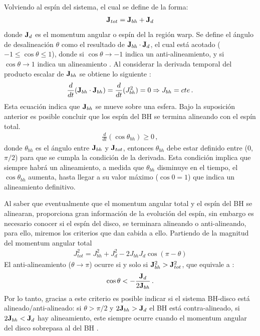 Volviendo al espín del sistema, el cual se define de la forma:
\begin{align}
	{\bf{J}}_{tot}= {\bf{J}}_{bh}+{\bf{J}}_{d}
\end{align}
donde ${\bf{J}}_{d}$ es el momentum angular o espín del la región warp. Se define el ángulo de desalineación $\theta$ como el resultado de  ${\bf{J}}_{bh}\cdot{\bf{J}}_{d}$, el cual está acotado ($-1\leq \cos\theta \leq 1$), donde si $\cos \theta \to -1$ indica un anti-alineamiento, y si $\cos \theta \to 1$ indica un alineamiento \cite{king2005}. Al considerar la derivada temporal del producto escalar de  ${\bf{J}}_{bh}$ se obtiene lo siguiente \cite{king2005}:
%
\begin{align}
    \frac{d }{dt}({\bf{J}}_{bh}\cdot {\bf{J}}_{bh})=  \frac{d}{dt}(J_{bh}^{2})= 0 \Rightarrow J_{bh}=cte\,.
\end{align}
%
Esta ecuación indica que ${\bf{J}}_{bh}$ se mueve sobre una esfera. Bajo la suposición anterior es posible concluir que los espín del BH se termina alineando con el espín total. 
%
\begin{align}
    \frac{d}{dt}(\cos\theta_{bh})\geq 0\,,
\end{align}
%
donde $\theta_{bh}$ es el ángulo entre ${\bf{J}}_{bh}$ y ${\bf{J}}_{tot}$, entonces $\theta_{bh}$ debe estar definido entre (0,$\pi/2$) para que se cumpla la condición de la derivada. Esta condición implica que siempre habrá un alineamiento, a medida que $\theta_{bh}$ disminuye en el tiempo, el $\cos\theta_{bh}$ aumenta, hasta llegar a su valor máximo ($\cos 0=1$) que indica un alineamiento definitivo.%

Al saber que eventualmente que el momentum angular total y el espín del BH se alinearan, proporciona gran información de la evolución del espín, sin embargo es necesario conocer si el espín del disco, se terminara alineando o anti-alineando, para ello, miremos los criterios que dan cabida a ello. Partiendo de la magnitud del momentum angular total
%
\begin{align}
    J^{2}_{tot} = J^{2}_{bh}+J_{d}^{2} -2J_{bh}J_{d}\cos(\pi -\theta)
\end{align}
%
El anti-alineamiento ($\theta\to\pi$) ocurre si y solo si ${\bf{J}}_{bh}^{2}>{\bf{J}}_{tot}^{2}$, que equivale a \cite{king2005}:
%
\begin{align}
    \cos\theta < - \frac{{\bf{J}}_{d}}{2{\bf{J}}_{bh}}\,.   
\end{align}
%
Por lo tanto, gracias a este criterio es posible indicar si el sistema BH-disco está alineado/anti-alineado: si $\theta >\pi/2$ y $2{\bf{J}}_{bh}>{\bf{J}}_{d}$ el BH está contra-alineado, si  $2{\bf{J}}_{bh}<{\bf{J}}_{d}$ hay alineamiento, este siempre ocurre cuando el momentum angular del disco sobrepasa al del BH \cite{king2005}.

